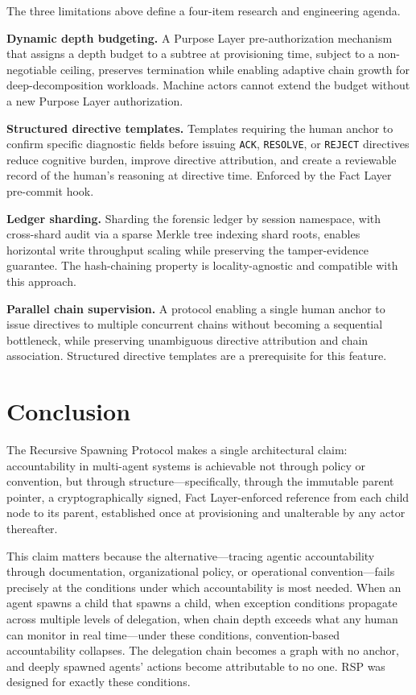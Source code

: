The three limitations above define a four-item research and engineering agenda.

\textbf{Dynamic depth budgeting.} A Purpose Layer pre-authorization mechanism that assigns a depth budget to a subtree at provisioning time, subject to a non-negotiable ceiling, preserves termination while enabling adaptive chain growth for deep-decomposition workloads. Machine actors cannot extend the budget without a new Purpose Layer authorization.

\textbf{Structured directive templates.} Templates requiring the human anchor to confirm specific diagnostic fields before issuing \texttt{ACK}, \texttt{RESOLVE}, or \texttt{REJECT} directives reduce cognitive burden, improve directive attribution, and create a reviewable record of the human's reasoning at directive time. Enforced by the Fact Layer pre-commit hook.

\textbf{Ledger sharding.} Sharding the forensic ledger by session namespace, with cross-shard audit via a sparse Merkle tree indexing shard roots, enables horizontal write throughput scaling while preserving the tamper-evidence guarantee. The hash-chaining property is locality-agnostic and compatible with this approach.

\textbf{Parallel chain supervision.} A protocol enabling a single human anchor to issue directives to multiple concurrent chains without becoming a sequential bottleneck, while preserving unambiguous directive attribution and chain association. Structured directive templates are a prerequisite for this feature.

\section{Conclusion}
\label{sec:rs-conclusion}

The Recursive Spawning Protocol makes a single architectural claim: accountability in multi-agent systems is achievable not through policy or convention, but through structure—specifically, through the immutable parent pointer, a cryptographically signed, Fact Layer-enforced reference from each child node to its parent, established once at provisioning and unalterable by any actor thereafter.

This claim matters because the alternative—tracing agentic accountability through documentation, organizational policy, or operational convention—fails precisely at the conditions under which accountability is most needed. When an agent spawns a child that spawns a child, when exception conditions propagate across multiple levels of delegation, when chain depth exceeds what any human can monitor in real time—under these conditions, convention-based accountability collapses. The delegation chain becomes a graph with no anchor, and deeply spawned agents' actions become attributable to no one. RSP was designed for exactly these conditions.

